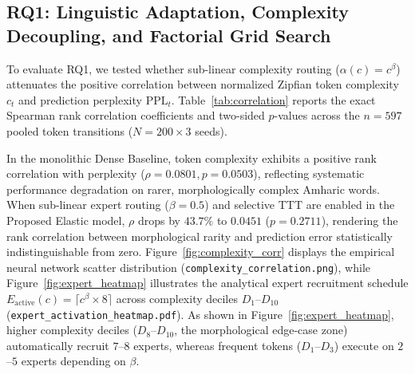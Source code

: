 \documentclass{interact}
\begin{document}
\subsection{RQ1: Linguistic Adaptation, Complexity Decoupling, and Factorial Grid Search}
\label{subsec:rq1_results}

To evaluate RQ1, we tested whether sub-linear complexity routing ($\alpha(c) = c^{\beta}$) attenuates the positive correlation between normalized Zipfian token complexity $c_t$ and prediction perplexity $\text{PPL}_t$. Table~\ref{tab:correlation} reports the exact Spearman rank correlation coefficients and two-sided $p$-values across the $n = 597$ pooled token transitions ($N=200 \times 3$ seeds).

\begin{table}[htbp]
    {}
    \label{tab:correlation}
\end{table}

In the monolithic Dense Baseline, token complexity exhibits a positive rank correlation with perplexity ($\rho = 0.0801, p = 0.0503$), reflecting systematic performance degradation on rarer, morphologically complex Amharic words. When sub-linear expert routing ($\beta = 0.5$) and selective TTT are enabled in the Proposed Elastic model, $\rho$ drops by $43.7\%$ to $0.0451$ ($p = 0.2711$), rendering the rank correlation between morphological rarity and prediction error statistically indistinguishable from zero. Figure~\ref{fig:complexity_corr} displays the empirical neural network scatter distribution (\texttt{complexity\_correlation.png}), while Figure~\ref{fig:expert_heatmap} illustrates the analytical expert recruitment schedule $E_{\text{active}}(c) = \lceil c^{\beta} \times 8 \rceil$ across complexity deciles $D_1$--$D_{10}$ (\texttt{expert\_activation\_heatmap.pdf}). As shown in Figure~\ref{fig:expert_heatmap}, higher complexity deciles ($D_8$--$D_{10}$, the morphological edge-case zone) automatically recruit $7$--$8$ experts, whereas frequent tokens ($D_1$--$D_3$) execute on $2$--$5$ experts depending on $\beta$.
\end{document}
